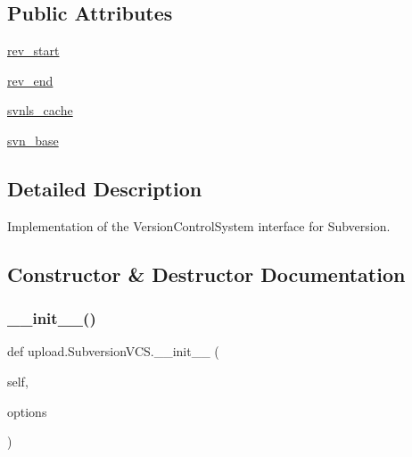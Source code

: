 \subsection*{Public Attributes}
\begin{DoxyCompactItemize}
\item 
\hyperlink{classupload_1_1_subversion_v_c_s_ad1553a69f4a790309273dbdeb9077732}{rev\+\_\+start}
\item 
\hyperlink{classupload_1_1_subversion_v_c_s_ac0bb07a099c722b7f8622de4b225904f}{rev\+\_\+end}
\item 
\hyperlink{classupload_1_1_subversion_v_c_s_aa801782f807674b06f491df5d7ca9942}{svnls\+\_\+cache}
\item 
\hyperlink{classupload_1_1_subversion_v_c_s_a60645c40d2fea4cd52881576bd13341f}{svn\+\_\+base}
\end{DoxyCompactItemize}


\subsection{Detailed Description}
\begin{DoxyVerb}Implementation of the VersionControlSystem interface for Subversion.\end{DoxyVerb}
 

\subsection{Constructor \& Destructor Documentation}
\mbox{\label{classupload_1_1_subversion_v_c_s_a8333f94e27335ce83eed0cc3f5a1eeb0}} 
\subsubsection{\texorpdfstring{\+\_\+\+\_\+init\+\_\+\+\_\+()}{\_\_init\_\_()}\hspace{0.1cm}{\footnotesize\ttfamily [1/2]}}
{\footnotesize\ttfamily def upload.\+Subversion\+V\+C\+S.\+\_\+\+\_\+init\+\_\+\+\_\+ (\begin{DoxyParamCaption}\item[{}]{self,  }\item[{}]{options }\end{DoxyParamCaption})}

